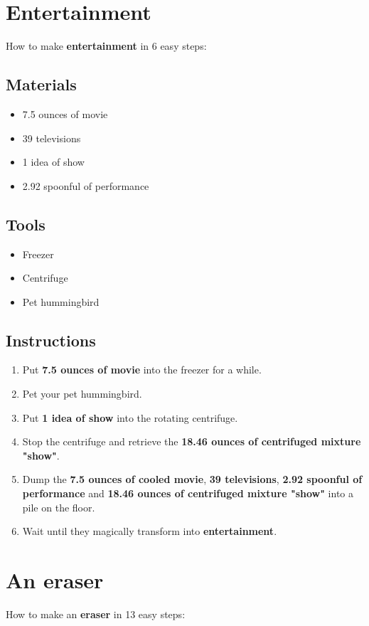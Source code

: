 \documentclass{article}
\begin{document}
\section{Entertainment}How to make \textbf{entertainment} in 6 easy steps:

\subsection{Materials}\begin{itemize}
\item 
7.5 ounces of movie
\item 
39 televisions
\item 
1 idea of show
\item 
2.92 spoonful of performance
\end{itemize}
\subsection{Tools}\begin{itemize}
\item 
Freezer
\item 
Centrifuge
\item 
Pet hummingbird
\end{itemize}
\subsection{Instructions}\begin{enumerate}
\item 
Put \textbf{7.5 ounces of movie} into the freezer for a while.
\item 
Pet your pet hummingbird.
\item 
Put \textbf{1 idea of show} into the rotating centrifuge.
\item 
Stop the centrifuge and retrieve the \textbf{18.46 ounces of centrifuged mixture "show"}.
\item 
Dump the \textbf{7.5 ounces of cooled movie}, \textbf{39 televisions}, \textbf{2.92 spoonful of performance} and \textbf{18.46 ounces of centrifuged mixture "show"} into a pile on the floor.
\item 
Wait until they magically transform into \textbf{entertainment}.
\end{enumerate}
\newpage
\section{An eraser}How to make an \textbf{eraser} in 13 easy steps:
\end{document}
